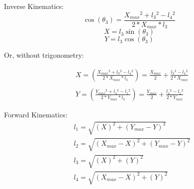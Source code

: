 \documentclass[conference]{IEEEtran}
\begin{document}
		Inverse Kinematics:
		\begin{equation}
		\cos(\theta_3) = \frac{X_{max}{}^2 + l_3{}^2 - l_4{}^2}{2*X_{max}*l_3}
		\end{equation}
		\begin{equation}
		X = l_3\sin(\theta_3)
		\end{equation}
		\begin{equation}
		Y = l_3\cos(\theta_3)
		\end{equation}
		
		Or, without trigonometry:
		
		\begin{equation} \label{inverse_kinematics_1}
		\begin{aligned}
		&X = \left(\frac{X_{max}{}^2 + l_3{}^2 - l_4{}^2}{2*X_{max}*l_3}\right) = \frac{X_{max}}{2} + \frac{l_3{}^2 - l_4{}^2}{2*X_{max}}\\ \\
		&Y = \left(\frac{Y_{max}{}^2 + l_4{}^2 - l_1{}^2}{2*Y_{max}*l_3}\right) = \frac{Y_{max}}{2} + \frac{l_4{}^2 - l_1{}^2}{2*Y_{max}}
		\end{aligned}
		\end{equation}
		
		Forward Kinematics:
		\begin{equation} \label{forward_kinematics_1}
		\begin{aligned}
		&l_1 = \sqrt{\left(X\right)^2 + \left(Y_{max}-Y\right)^2}\\
		&l_2 = \sqrt{\left(X_{max}-X\right)^2 + \left(Y_{max}-Y\right)^2}\\
		&l_3 = \sqrt{\left(X\right)^2 + \left(Y\right)^2}\\
		&l_4 = \sqrt{\left(X_{max}-X\right)^2 + \left(Y\right)^2}\\
		\end{aligned}
		\end{equation}
	
\end{document}
